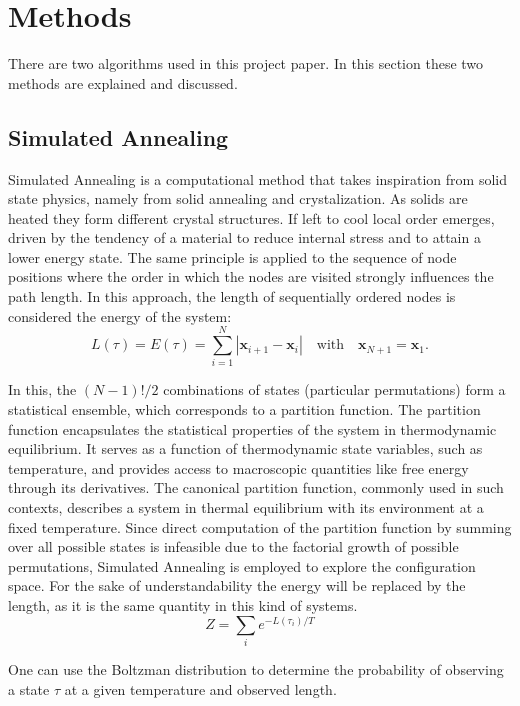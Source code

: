 \section{Methods}
\label{sec:Methods}

There are two algorithms used in this project paper. 
In this section these two methods are explained and discussed.
\subsection{Simulated Annealing}
Simulated Annealing is a computational method that takes inspiration from solid state physics, namely from solid annealing and crystalization.
As solids are heated they form different crystal structures.
If left to cool local order emerges, driven by the tendency of a material to reduce internal stress and to attain a lower energy state.
The same principle is applied to the sequence of node positions where the order in which the nodes are visited strongly influences the path length. 
In this approach, the length of sequentially ordered nodes is considered the energy of the system:
\begin{equation}
    L(\tau) = E(\tau) = \sum_{i=1}^{N} |\mathbf{x}_{i+1} - \mathbf{x}_i| \quad \text{with} \quad \mathbf{x}_{N+1} = \mathbf{x}_1.
    \label{eg:energy}
\end{equation}

In this, the $(N-1)!/2$ combinations of states (particular permutations) form a statistical ensemble, which corresponds to a partition function. 
The partition function encapsulates the statistical properties of the system in thermodynamic equilibrium. 
It serves as a function of thermodynamic state variables, such as temperature, and provides access to macroscopic quantities like free energy through its derivatives.
The canonical partition function, commonly used in such contexts, describes a system in thermal equilibrium with its environment at a fixed temperature. 
Since direct computation of the partition function by summing over all possible states is infeasible due to the factorial growth of possible permutations, Simulated Annealing is employed to explore the configuration space.
For the sake of understandability the energy will be replaced by the length, as it is the same quantity in this kind of systems.
\begin{equation}
    Z = \sum_i e^{- L(\tau_i) /T}
    \label{eq:partition}
\end{equation}

\noindent One can use the Boltzman distribution to determine the probability of observing a state $\tau$ at a given temperature and observed length.

